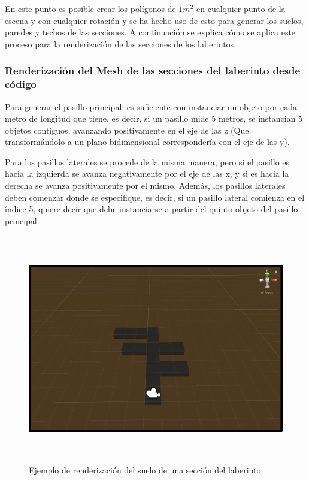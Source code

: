 \documentclass[../main.tex]{subfiles}
\begin{document}
En este punto es posible crear los polígonos de $1m^2$ en cualquier punto de la escena y con cualquier rotación y se ha hecho uso de esto para generar los suelos, paredes y techos de las secciones. A continuación se explica cómo se aplica este proceso para la renderización de las secciones de los laberintos.

\subsubsection{Renderización del Mesh de las secciones del laberinto desde código}

Para generar el pasillo principal, es suficiente con instanciar un objeto por cada metro de longitud que tiene, es decir, si un pasillo mide 5 metros, se instancian 5 objetos contiguos, avanzando positivamente en el eje de las z (Que transformándolo a un plano bidimensional correspondería con el eje de las y).

Para los pasillos laterales se procede de la misma manera, pero si el pasillo es hacia la izquierda se avanza negativamente por el eje de las x, y si es hacia la derecha se avanza positivamente por el mismo. Además, los pasillos laterales deben comenzar donde se especifique, es decir, si un pasillo lateral comienza en el índice 5, quiere decir que debe instanciarse a partir del quinto objeto del pasillo principal.

\begin{figure}[h!]
\hspace{-1.25cm}
\includegraphics[width=15cm, height=10cm]{imagenes/Floor_Node_Example.png}
\caption{Ejemplo de renderización del suelo de una sección del laberinto.}
\label{fig:Floor_Unity_Example}
\end{figure}
\end{document}
